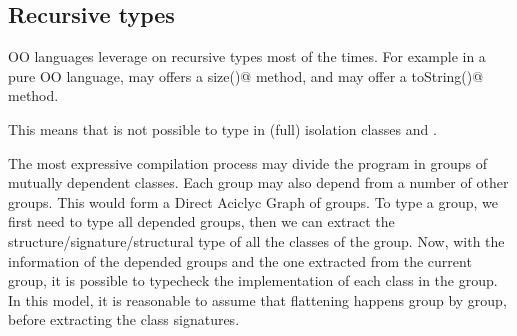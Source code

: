  \subsection{Recursive types}

OO languages leverage on recursive types most of the times.
For example in a pure OO language, \Q@String@ may offers a \Q@Int size()@
method, and \Q@Int@ may offer a \Q@String toString()@ method.

This means that is not possible to type in (full) isolation classes
\Q@String@ and \Q@Int@.

The most expressive compilation process may divide the program in groups of mutually 
dependent classes.
Each group may also depend from a number of other groups.
This would form a Direct Aciclyc Graph of groups.
To type a group, we first need to type all depended groups, then
we can extract the structure/signature/structural type of all
the classes of the group.
Now, with the information of the depended groups and the one extracted
from the current group, it is possible to typecheck the implementation
 of each class in the group.
In this model, it is reasonable to assume that flattening happens group by group, before
extracting the class signatures.

